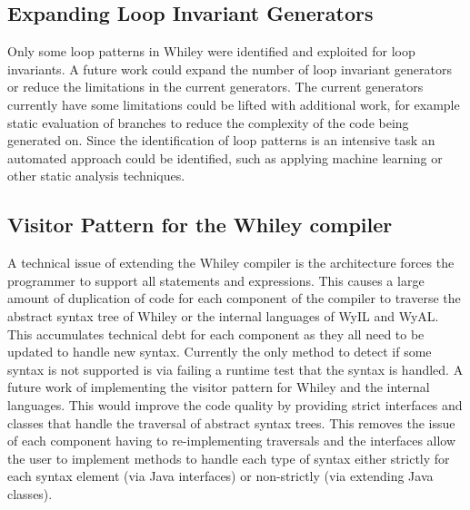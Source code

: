 \subsection{Expanding Loop Invariant Generators}

Only some loop patterns in Whiley were identified and exploited for loop
invariants.
A future work could expand the number of loop invariant generators or reduce
the limitations in the current generators.
The current generators currently have some limitations could be lifted with
additional work, for example static evaluation of branches to reduce the
complexity of the code being generated on.
Since the identification of loop patterns is an intensive task an automated
approach could be identified, such as applying machine learning or other static
analysis techniques.

\subsection{Visitor Pattern for the Whiley compiler}

A technical issue of extending the Whiley compiler is the architecture forces
the programmer to support all statements and expressions.
This causes a large amount of duplication of code for each component of the
compiler to traverse the abstract syntax tree of Whiley or the internal
languages of WyIL and WyAL.
This accumulates technical debt for each component as they all need to be
updated to handle new syntax.
Currently the only method to detect if some syntax is not supported is via 
failing a runtime test that the syntax is handled.
A future work of implementing the visitor pattern for Whiley and the internal
languages.
This would improve the code quality by providing strict interfaces and
classes that handle the traversal of abstract syntax trees.
This removes the issue of each component having to re-implementing traversals
and the interfaces allow the user to implement methods to handle each type of
syntax either strictly for each syntax element (via Java interfaces) or
non-strictly (via extending Java classes).

